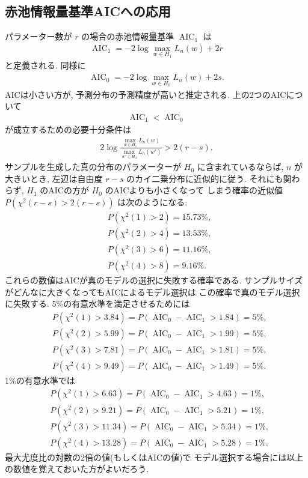 \documentclass[12pt,twoside]{jarticle}
\theoremstyle{jplain}
\theoremstyle{jplain}
\theoremstyle{jplain}
\numberwithin{theorem}{section}
\numberwithin{equation}{section}
\numberwithin{figure}{section}
\numberwithin{table}{section}
\begin{document}
\subsection{赤池情報量基準AICへの応用}
\newcommand\AIC{\operatorname{AIC}}

パラメーター数が $r$ の場合の赤池情報量基準 $\AIC_1$ は
\begin{align*}
  \AIC_1 = -2\log\max_{w\in H_1}L_n(w) + 2r
\end{align*}
と定義される. 同様に
\begin{align*}
  \AIC_0 = -2\log\max_{w\in H_0}L_n(w) + 2s.
\end{align*}
AICは小さい方が, 予測分布の予測精度が高いと推定される.
上の2つのAICについて
\begin{align*}
  \AIC_1 < \AIC_0
\end{align*}
が成立するための必要十分条件は
\begin{align*}
  2\log\frac{\max_{w\in H_1} L_n(w)}{\max_{w'\in H_0}L_n(w')}
  > 2(r-s).
\end{align*}
サンプルを生成した真の分布のパラメーターが $H_0$ に含まれているならば,
$n$ が大きいとき, 左辺は自由度 $r-s$ のカイ二乗分布に近似的に従う.
それにも関わらず, $H_1$ のAICの方が $H_0$ のAICよりも小さくなって
しまう確率の近似値 $P(\chi^2(r-s)>2(r-s))$ は次のようになる:
\begin{align*}
  &
  P(\chi^2(1)>2) = 15.73\%, \\ &
  P(\chi^2(2)>4) = 13.53\%, \\ &
  P(\chi^2(3)>6) = 11.16\%, \\ &
  P(\chi^2(4)>8) =  9.16\%.
\end{align*}
これらの数値はAICが真のモデルの選択に失敗する確率である.
サンプルサイズがどんなに大きくなってもAICによるモデル選択は
この確率で真のモデル選択に失敗する.
5\%の有意水準を満足させるためには
\begin{align*}
  &
  P(\chi^2(1)>3.84) = P(\AIC_0-\AIC_1>1.84) = 5\%, \\ &
  P(\chi^2(2)>5.99) = P(\AIC_0-\AIC_1>1.99) = 5\%, \\ &
  P(\chi^2(3)>7.81) = P(\AIC_0-\AIC_1>1.81) = 5\%, \\ &
  P(\chi^2(4)>9.49) = P(\AIC_0-\AIC_1>1.49) = 5\%.
\end{align*}
1\%の有意水準では
\begin{align*}
  &
  P(\chi^2(1)>6.63)  = P(\AIC_0-\AIC_1>4.63) = 1\%, \\ &
  P(\chi^2(2)>9.21)  = P(\AIC_0-\AIC_1>5.21) = 1\%, \\ &
  P(\chi^2(3)>11.34) = P(\AIC_0-\AIC_1>5.34) = 1\%, \\ &
  P(\chi^2(4)>13.28) = P(\AIC_0-\AIC_1>5.28) = 1\%.
\end{align*}
最大尤度比の対数の2倍の値(もしくはAICの値)で
モデル選択する場合には以上の数値を覚えておいた方がよいだろう.
\end{document}
